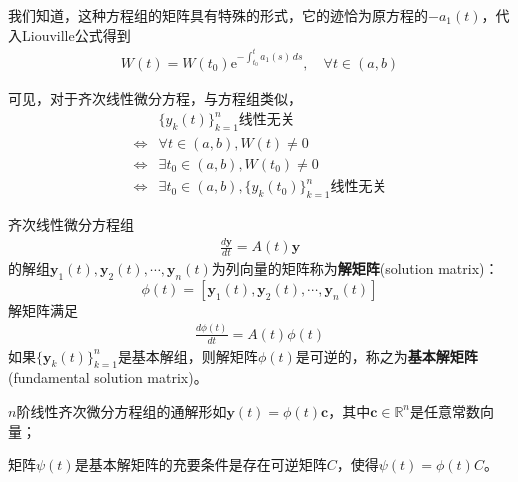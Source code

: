 我们知道，这种方程组的矩阵具有特殊的形式，它的迹恰为原方程的$-a_1(t)$，代入Liouville公式得到\begin{align*}
    W(t)=W(t_0)\mathrm{e}^{-\int_{t_0}^t a_1(s)\,ds},\quad\forall t\in(a,b)
\end{align*}

可见，对于齐次线性微分方程，与方程组类似，\begin{align*}
    &\{y_k(t)\}_{k=1}^n\text{线性无关}\\
    \iff& \forall t\in(a,b),W(t)\neq 0\\
    \iff& \exists t_0\in(a,b),W(t_0)\neq 0\\
    \iff& \exists t_0\in(a,b),\{y_k(t_0)\}_{k=1}^n\text{线性无关}
\end{align*}

\begin{definition}[解矩阵]
    齐次线性微分方程组\begin{align*}
    \frac{d\mathbf{y}}{dt}=A(t)\mathbf{y}
    \end{align*}
    的解组$\mathbf{y}_1(t),\mathbf{y}_2(t),\cdots,\mathbf{y}_n(t)$为列向量的矩阵称为\textbf{解矩阵}(solution matrix)：
    \[\phi(t)=[\mathbf{y}_1(t),\mathbf{y}_2(t),\cdots,\mathbf{y}_n(t)]\]
    解矩阵满足\begin{align*}
        \frac{d\phi(t)}{dt}=A(t)\phi(t)
    \end{align*}
    如果$\{\mathbf{y}_k(t)\}_{k=1}^n$是基本解组，则解矩阵$\phi(t)$是可逆的，称之为\textbf{基本解矩阵}(fundamental solution matrix)。
\end{definition}
\begin{proposition}
    $n$阶线性齐次微分方程组的通解形如$\mathbf{y}(t)=\phi(t)\mathbf{c}$，其中$\mathbf{c}\in\mathbb{R}^n$是任意常数向量；

    矩阵$\psi(t)$是基本解矩阵的充要条件是存在可逆矩阵$C$，使得$\psi(t)=\phi(t)C$。
\end{proposition}

